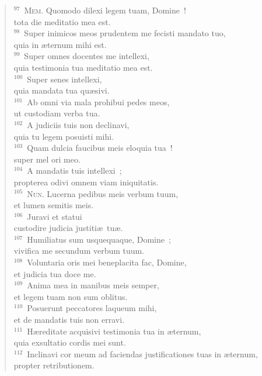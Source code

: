 \begin{flushleft}
\begin{verse}
${}^{97}$~\textsc{Mem.} Quomodo dilexi legem tuam, Domine~!\\ tota die meditatio mea est.\\
${}^{98}$~Super inimicos meos prudentem me fecisti mandato tuo,\\ quia in \ae ternum mihi est.\\
${}^{99}$~Super omnes docentes me intellexi,\\ quia testimonia tua meditatio mea est.\\
${}^{100}$~Super senes intellexi,\\ quia mandata tua qu\ae sivi.\\
${}^{101}$~Ab omni via mala prohibui pedes meos,\\ ut custodiam verba tua.\\
${}^{102}$~A judiciis tuis non declinavi,\\ quia tu legem posuisti mihi.\\
${}^{103}$~Quam dulcia faucibus meis eloquia tua~!\\ super mel ori meo.\\
${}^{104}$~A mandatis tuis intellexi~;\\ propterea odivi omnem viam iniquitatis.\\
${}^{105}$~\textsc{Nun.} Lucerna pedibus meis verbum tuum,\\ et lumen semitis meis.\\
${}^{106}$~Juravi et statui\\ custodire judicia justiti\ae\ tu\ae .\\
${}^{107}$~Humiliatus sum usquequaque, Domine~;\\ vivifica me secundum verbum tuum.\\
${}^{108}$~Voluntaria oris mei beneplacita fac, Domine,\\ et judicia tua doce me.\\
${}^{109}$~Anima mea in manibus meis semper,\\ et legem tuam non sum oblitus.\\
${}^{110}$~Posuerunt peccatores laqueum mihi,\\ et de mandatis tuis non erravi.\\
${}^{111}$~H\ae reditate acquisivi testimonia tua in \ae ternum,\\ quia exsultatio cordis mei sunt.\\
${}^{112}$~Inclinavi cor meum ad faciendas justificationes tuas in \ae ternum,\\ propter retributionem.\\

\end{verse}
\end{flushleft}

